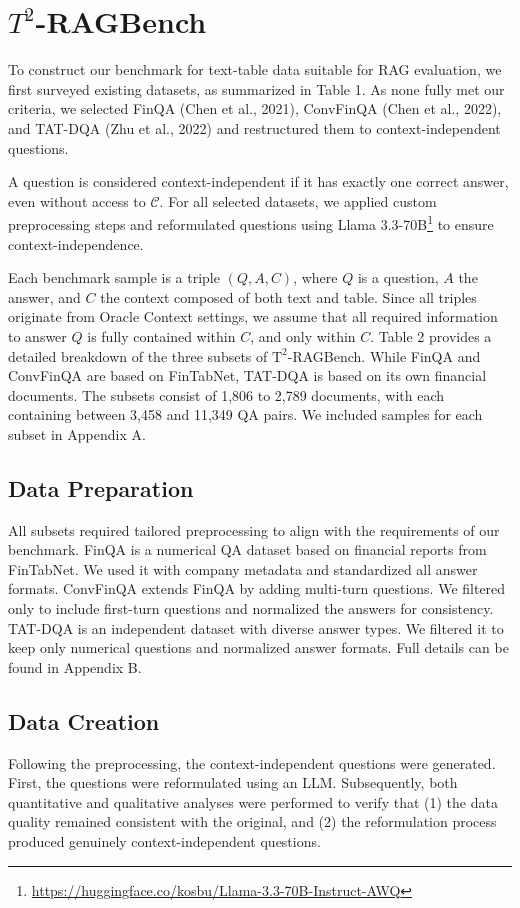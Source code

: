 \documentclass[10pt]{article}
\begin{document}
\section{$T^2$-RAGBench}
To construct our benchmark for text-table data suitable for RAG evaluation, we first surveyed existing datasets, as summarized in Table 1. As none fully met our criteria, we selected FinQA (Chen et al., 2021), ConvFinQA (Chen et al., 2022), and TAT-DQA (Zhu et al., 2022) and restructured them to context-independent questions.

A question is considered context-independent if it has exactly one correct answer, even without access to $\mathcal{C}$. For all selected datasets, we applied custom preprocessing steps and reformulated questions using Llama 3.3-70B\footnote{\url{https://huggingface.co/kosbu/Llama-3.3-70B-Instruct-AWQ}} to ensure context-independence.

Each benchmark sample is a triple $(Q, A, C)$, where $Q$ is a question, $A$ the answer, and $C$ the context composed of both text and table. Since all triples originate from Oracle Context settings, we assume that all required information to answer $Q$ is fully contained within $C$, and only within $C$. Table 2 provides a detailed breakdown of the three subsets of $\mathrm{T}^2$-RAGBench. While FinQA and ConvFinQA are based on FinTabNet, TAT-DQA is based on its own financial documents. The subsets consist of 1,806 to 2,789 documents, with each containing between 3,458 and 11,349 QA pairs. We included samples for each subset in Appendix A.

\subsection{Data Preparation}
All subsets required tailored preprocessing to align with the requirements of our benchmark. FinQA is a numerical QA dataset based on financial reports from FinTabNet. We used it with company metadata and standardized all answer formats. ConvFinQA extends FinQA by adding multi-turn questions. We filtered only to include first-turn questions and normalized the answers for consistency. TAT-DQA is an independent dataset with diverse answer types. We filtered it to keep only numerical questions and normalized answer formats. Full details can be found in Appendix B.

\subsection{Data Creation}
Following the preprocessing, the context-independent questions were generated. First, the questions were reformulated using an LLM. Subsequently, both quantitative and qualitative analyses were performed to verify that (1) the data quality remained consistent with the original, and (2) the reformulation process produced genuinely context-independent questions.
\end{document}
